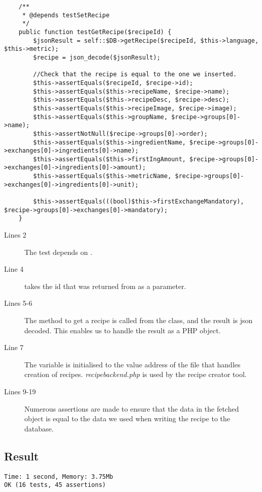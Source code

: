 \begin{lstlisting}
    /**
     * @depends testSetRecipe
     */
    public function testGetRecipe($recipeId) {
        $jsonResult = self::$DB->getRecipe($recipeId, $this->language, $this->metric);
        $recipe = json_decode($jsonResult);

        //Check that the recipe is equal to the one we inserted.
        $this->assertEquals($recipeId, $recipe->id);
        $this->assertEquals($this->recipeName, $recipe->name);
        $this->assertEquals($this->recipeDesc, $recipe->desc);
        $this->assertEquals($this->recipeImage, $recipe->image);
        $this->assertEquals($this->groupName, $recipe->groups[0]->name);
        $this->assertNotNull($recipe->groups[0]->order);
        $this->assertEquals($this->ingredientName, $recipe->groups[0]->exchanges[0]->ingredients[0]->name);
        $this->assertEquals($this->firstIngAmount, $recipe->groups[0]->exchanges[0]->ingredients[0]->amount);
        $this->assertEquals($this->metricName, $recipe->groups[0]->exchanges[0]->ingredients[0]->unit);

        $this->assertEquals(((bool)$this->firstExchangeMandatory), $recipe->groups[0]->exchanges[0]->mandatory);
    }
\end{lstlisting}%

\begin{description}
\item[Lines 2] The test depends on .
\item[Line 4]  takes the id that was returned from  as a parameter.
\item[Lines 5-6] The method to get a recipe is called from the  class, and the result is \ac{json} decoded. This enables us to handle the result as a PHP object.
\item[Line 7] The  variable is initialised to the value address of the file that handles creation of recipes. \textit{recipebackend.php} is used by the recipe creator tool.%
\item[Lines 9-19] Numerous assertions are made to ensure that the data in the fetched object is equal to the data we used when writing the recipe to the database.
\end{description}

\subsection*{Result}
\begin{lstlisting}[numbers=none, basicstyle=\ttfamily, caption={The result of the PHPUnit test}]
Time: 1 second, Memory: 3.75Mb
OK (16 tests, 45 assertions)
\end{lstlisting}

